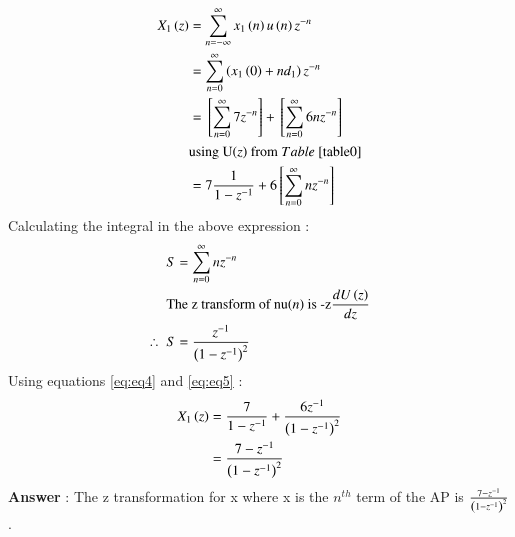 \documentclass[journal,12pt,twocolumn]{IEEEtran}
\theoremstyle{remark}
\begin{document}
\begin{align}
X_{1}\brak{z} &= \sum_{n=-\infty}^{\infty}x_{1}\brak{n}u\brak{n}z^{-n}\\
 &= \sum_{n=0}^{\infty}\brak{x_{1}\brak{0}+nd_{1}}z^{-n} \\
 &=  \sbrak{\sum_{n=0}^{\infty}7z^{-n}} + \sbrak{\sum_{n=0}^{\infty}6nz^{-n}}\\
  &\text{using U\brak{z} from }\tabref{table0}\\
 &= 7\frac{1}{1-z^{-1}} + 6\sbrak{\sum_{n=0}^{\infty}nz^{-n}} \label{eq:eq4}
\end{align}
Calculating the integral in the above expression :\\
\begin{align}
&S = \sum_{n=0}^{\infty}nz^{-n}\\
&\text{The z transform of nu\ensuremath{\left(n\right)} is -z$\frac{dU\left(z\right)}{dz}$}\\
\therefore \hspace{2mm} & S = \frac{z^{-1}}{\left(1-z^{-1}\right)^2}\label{eq:eq5}
\end{align}
Using equations \eqref{eq:eq4} and \eqref{eq:eq5} :\\
\begin{align}
X_{1}\left(z\right) &= \frac{7}{1 - z^{-1}} + \frac{6z^{-1}}{\left(1 - z^{-1}\right)^2}\\
 &= \frac{7 - z^{-1}}{\left(1-z^{-1}\right)^2}
\end{align}
\large\textbf{Answer} : \normalsize The z transformation for x where x is the $n^{th}$ term of the AP is $\frac{7 - z^{-1}}{\left(1-z^{-1}\right)^2}$.

\vspace{4mm}

\textbf{} 
\end{document}
